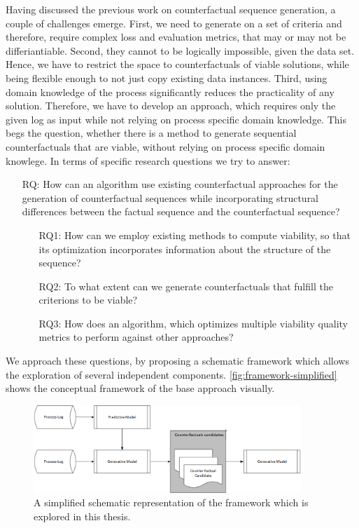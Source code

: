 \documentclass[./../../paper.tex]{subfiles}
\begin{document}
Having discussed the previous work on counterfactual sequence generation, a couple of challenges emerge.
First, we need to generate on a set of criteria and therefore, require complex loss and evaluation metrics, that may or may not be differiantiable. Second, they cannot to be logically impossible, given the data set.
Hence, we have to restrict the space to counterfactuals of viable solutions, while being flexible enough to not just copy existing data instances.
Third, using domain knowledge of the process significantly reduces the practicality of any solution. Therefore, we have to develop an approach, which requires only the given log as input while not relying on process specific domain knowledge. This begs the question, whether there is a method to generate sequential counterfactuals that are viable, without relying on process specific domain knowlege. In terms of specific research questions we try to answer:

\begin{itemize}
    \item[RQ:] How can an algorithm use existing counterfactual approaches for the generation of counterfactual sequences while incorporating structural differences between the factual sequence and the counterfactual sequence?
          \begin{itemize}
            \item[RQ1:] How can we employ existing methods to compute viability, so that its optimization incorporates information about the structure of the sequence?
              \item[RQ2:] To what extent can we generate counterfactuals that fulfill the criterions to be viable?
              \item[RQ3:] How does an algorithm, which optimizes multiple viability quality metrics to perform against other approaches?
          \end{itemize}
\end{itemize}

\noindent We approach these questions, by proposing a schematic framework which allows the exploration of several independent components. \autoref{fig:framework-simplified} shows the conceptual framework of the base approach visually.

\begin{figure}[htb]
    \centering
    \includegraphics[width=0.9\textwidth]{figures/framework_simplified.png}
    \caption{A simplified schematic representation of the framework which is explored in this thesis.}
    \label{fig:framework-simplified}
\end{figure}
\end{document}
